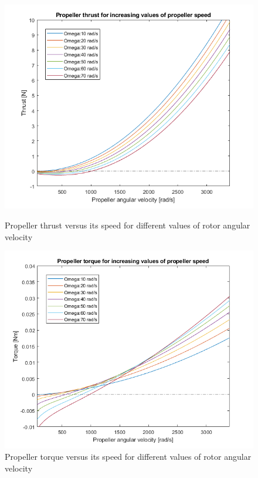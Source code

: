         \begin{figure}[h]
            \centering
            \begin{minipage}{0.45\textwidth}
                \centering
                \includegraphics[width=\textwidth]{figs/Model/Props/Prop_thrust_vs_speed.png}
                \caption[Propeller thrust versus speed graph]{Propeller thrust versus its speed for different values of rotor angular velocity}
                \label{fig: prop_thrust_vs_velocity}
            \end{minipage}\hfill
            \begin{minipage}{0.45\textwidth}
                \centering
                \includegraphics[width=\textwidth]{figs/Model/Props/Prop_torque_vs_speed.png}
                \caption[Propeller torque versus speed graph]{Propeller torque versus its speed for different values of rotor angular velocity}
                \label{fig: prop_torque_vs_velocity}
            \end{minipage}
        \end{figure}
